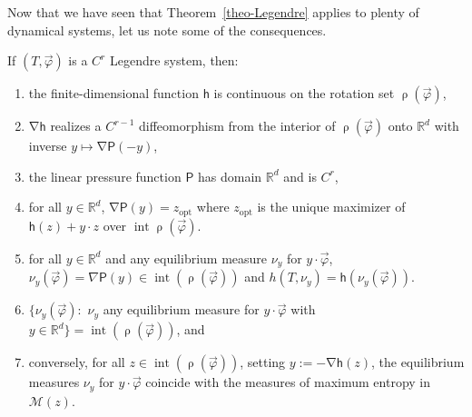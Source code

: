 \documentclass[10pt]{amsart}
\theoremstyle{definition}\newtheorem{defi}[theo]{Definition}\newtheorem{rema}[theo]{Remark}\newtheorem{exam}[theo]{Example}\newtheorem{exem}[theo]{Example}\newtheorem{nota}[theo]{Notation}
\theoremstyle{plain}
\theoremstyle{plain}
\newcommand\vpot{\vec\pot}
\DeclareMathOperator{\interior}{int}
\newcommand{\rs}{\operatorname{\rho}}
\newcommand{\grad}{\operatorname{\nabla}}
\newcommand{\opt}{\mathrm{opt}}
\newcommand{\hf}{\mathsf{h}}
\newcommand{\Pf}{\mathsf{P}}
\newcommand{\pot}{\varphi}
\newcommand*\8{\infty}
\newcommand\RR{\mathbb{R}}
\newcommand{\cM}{\mathcal{M}}
\begin{document}
Now that we have seen that Theorem~\ref{theo-Legendre} applies to plenty of dynamical systems, let us note some of the consequences.


\break
\begin{prop}\label{prop:nlem}
If $(T,\vpot)$ is a $C^r$ Legendre system, then:
\begin{enumerate}
\item the finite-dimensional function $\hf$ is continuous on the rotation set $\rs(\vpot)$,
\item $\grad \hf$ realizes a $C^{r-1}$ diffeomorphism from the interior of $\rs(\vpot)$ onto $\RR^d$ with inverse $ y\mapsto\grad \Pf(- y)$,
\item the linear pressure function $\Pf$ has domain $\RR^d$ and is $C^r$,
\item for all $ y\in\RR^d$, $\grad \Pf(y) = z_{\opt}$ where $ z_{\opt}$ is the unique maximizer of $\hf(z)+ y\cdot z$ over $\interior\rs(\vpot)$.
\item\label{eq-int-ent}
for all $y\in\RR^d$ and any equilibrium measure $\nu_y$ for $y\cdot\vec\pot$, $\nu_{ y}(\vpot)=\nabla\Pf(y)\in\interior(\rs(\vpot))$ and $h(T,\nu_{ y})=\hf(\nu_{ y}(\vpot))$.
\item\label{eq-eq-values}
$\{\nu_{ y}(\vpot):$ $\nu_y$ any equilibrium measure for $y\cdot\vec\pot$ with $y\in\RR^d\} = \interior(\rs(\vpot))$, and
\item\label{eq-rev}
conversely, for all $ z\in\interior(\rs(\vpot))$, setting $y:=-\grad \hf(z)$, the equilibrium measures $\nu_y$ for $y\cdot\vec\pot$ coincide with the measures of maximum entropy in $\cM(z)$.
\end{enumerate}
\end{prop}
\end{document}
